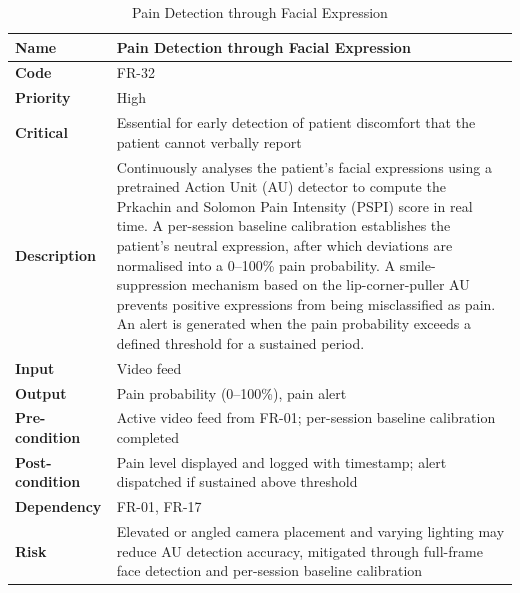 \begin{table}[htbp]
\centering
\caption{Pain Detection through Facial Expression}
\renewcommand{\arraystretch}{1.3}
\begin{tabular}{|p{3.5cm}|p{10cm}|}
\hline
\textbf{Name} & Pain Detection through Facial Expression \\ \hline
\textbf{Code} & FR-32 \\ \hline
\textbf{Priority} & High \\ \hline
\textbf{Critical} & Essential for early detection of patient discomfort that the patient cannot verbally report \\ \hline
\textbf{Description} & Continuously analyses the patient's facial expressions using a pretrained Action Unit (AU) detector to compute the Prkachin and Solomon Pain Intensity (PSPI) score in real time. A per-session baseline calibration establishes the patient's neutral expression, after which deviations are normalised into a 0--100\% pain probability. A smile-suppression mechanism based on the lip-corner-puller AU prevents positive expressions from being misclassified as pain. An alert is generated when the pain probability exceeds a defined threshold for a sustained period. \\ \hline
\textbf{Input} & Video feed \\ \hline
\textbf{Output} & Pain probability (0--100\%), pain alert \\ \hline
\textbf{Pre-condition} & Active video feed from FR-01; per-session baseline calibration completed \\ \hline
\textbf{Post-condition} & Pain level displayed and logged with timestamp; alert dispatched if sustained above threshold \\ \hline
\textbf{Dependency} & FR-01, FR-17 \\ \hline
\textbf{Risk} & Elevated or angled camera placement and varying lighting may reduce AU detection accuracy, mitigated through full-frame face detection and per-session baseline calibration \\ \hline
\end{tabular}
\end{table}
